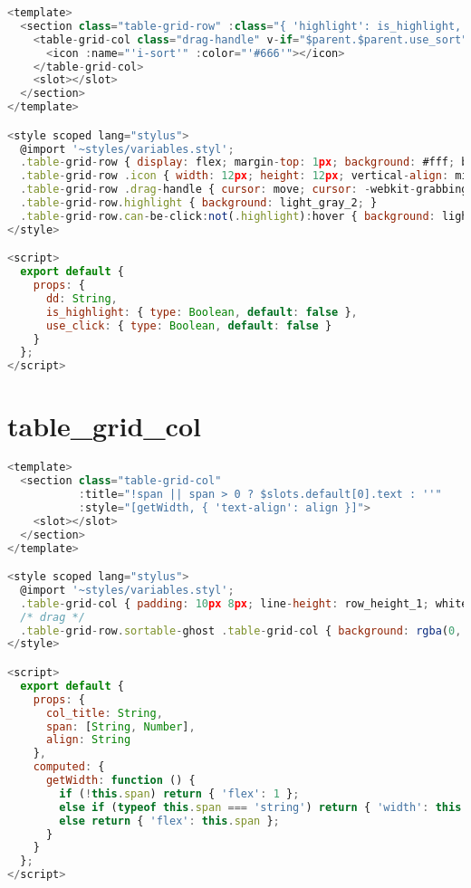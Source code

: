 \begin{lstlisting}[language=JavaScript]
<template>
  <section class="table-grid-row" :class="{ 'highlight': is_highlight, 'can-be-click': use_click }">
    <table-grid-col class="drag-handle" v-if="$parent.$parent.use_sort" :span="'35px'">
      <icon :name="'i-sort'" :color="'#666'"></icon>
    </table-grid-col>
    <slot></slot>
  </section>
</template>

<style scoped lang="stylus">
  @import '~styles/variables.styl';
  .table-grid-row { display: flex; margin-top: 1px; background: #fff; box-shadow: 0 1px 2px -1px rgba(0, 0, 0, .1); transition: all .2s; }
  .table-grid-row .icon { width: 12px; height: 12px; vertical-align: middle; }
  .table-grid-row .drag-handle { cursor: move; cursor: -webkit-grabbing; text-align: center; }
  .table-grid-row.highlight { background: light_gray_2; }
  .table-grid-row.can-be-click:not(.highlight):hover { background: light_gray_3; cursor: pointer; }
</style>

<script>
  export default {
    props: {
      dd: String,
      is_highlight: { type: Boolean, default: false },
      use_click: { type: Boolean, default: false }
    }
  };
</script>

\end{lstlisting}

\chapter{table\_grid\_col}

\begin{lstlisting}[language=JavaScript]
<template>
  <section class="table-grid-col"
           :title="!span || span > 0 ? $slots.default[0].text : ''"
           :style="[getWidth, { 'text-align': align }]">
    <slot></slot>
  </section>
</template>

<style scoped lang="stylus">
  @import '~styles/variables.styl';
  .table-grid-col { padding: 10px 8px; line-height: row_height_1; white-space: nowrap; overflow: hidden; text-overflow: ellipsis; }
  /* drag */
  .table-grid-row.sortable-ghost .table-grid-col { background: rgba(0, 0, 0, .02); }
</style>

<script>
  export default {
    props: {
      col_title: String,
      span: [String, Number],
      align: String
    },
    computed: {
      getWidth: function () {
        if (!this.span) return { 'flex': 1 };
        else if (typeof this.span === 'string') return { 'width': this.span };
        else return { 'flex': this.span };
      }
    }
  };
</script>

\end{lstlisting}




